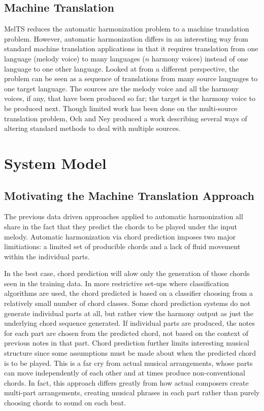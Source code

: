 \documentclass{sig-alternate}
\begin{document}
\subsection{Machine Translation}
MelTS reduces the automatic harmonization problem to a machine translation problem. However, automatic harmonization differs in an interesting way from standard machine translation applications in that it requires translation from one language (melody voice) to many languages ($n$ harmony voices) instead of one language to one other language. Looked at from a different perspective, the problem can be seen as a sequence of translations from many source languages to one target language. The sources are the melody voice and all the harmony voices, if any, that have been produced so far; the target is the harmony voice to be produced next. Though limited work has been done on the multi-source translation problem, Och and Ney \cite{franzjosefochhermannney2001} produced a work describing several ways of altering standard methods to deal with multiple sources.

\section{System Model}
\label{sec:sys_model}
\subsection{Motivating the Machine Translation Approach}

The previous data driven approaches applied to automatic harmonization all share in the fact that they predict the chords to be played under the input melody. Automatic harmonization via chord prediction imposes two major limitiations: a limited set of producible chords and a lack of fluid movement within the individual parts. 

In the best case, chord prediction will alow only the generation of those chords seen in the training data. In more restrictive set-ups where classification algorithms are used, the chord predicted is based on a classifier choosing from a relatively small number of chord classes. Some chord prediction systems do not generate individual parts at all, but rather view the harmony output as just the underlying chord sequence generated. If individual parts are produced, the notes for each part are chosen from the predicted chord, not based on the context of previous notes in that part. Chord prediction further limits interesting musical structure since some assumptions must be made about when the predicted chord is to be played. This is a far cry from actual musical arrangements, whose parts can move independently of each other and at times produce non-conventional chords. In fact, this approach differs greatly from how actual composers create multi-part arrangements, creating musical phrases in each part rather than purely choosing chords to sound on each beat.
\end{document}
